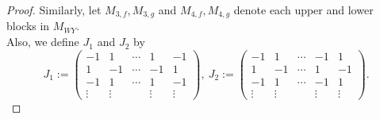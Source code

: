 \documentclass[12pt]{amsart}
\theoremstyle{definition}
\newcommand{\AAA}{\mathcal{A}}
\begin{document}
\begin{proof}
\begin{table}[h]
\vspace{1mm}%
    \caption{The determinant $\det M_{WY}(\AAA,m)$ for each case}
  \label{tabular:B_2}
\end{table}
%
Similarly, 
let $M_{3,f},M_{3,g}$ and $M_{4,f},M_{4,g}$ 
denote each upper and lower blocks in $M_{WY}$.\\ %
Also, we define $J_1$ and $J_2$ by 
\[
J_1:=
\left(
\begin{array}{ccccc}
 -1 &  1 & \cdots &  1 & -1 \\
  1 & -1 & \cdots & -1 &  1 \\
 -1 &  1 & \cdots &  1 & -1 \\
 \vdots & \vdots &  & \vdots & \vdots 
\end{array}
\right),\ 
J_2:=
\left(
\begin{array}{ccccc}
 -1 &  1 & \cdots & -1 &  1 \\
  1 & -1 & \cdots &  1 & -1 \\
 -1 &  1 & \cdots & -1 &  1 \\
 \vdots & \vdots &  & \vdots & \vdots 
\end{array}
\right).
\]


\end{proof}
\end{document}
